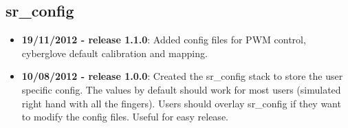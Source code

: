 
\subsection{sr\_config}
\label{sec:sr-config-changelog}

\begin{itemize}
\item \textbf{19/11/2012 - release 1.1.0}: Added config files for PWM control, cyberglove default calibration and mapping.
\item \textbf{10/08/2012 - release 1.0.0}: Created the sr\_config stack to store the user specific config. The values by default should work for most users (simulated right hand with all the fingers). Users should overlay sr\_config if they want to modify the config files. Useful for easy release.
\end{itemize}